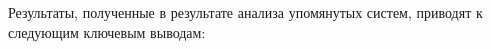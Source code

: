 Результаты, полученные в результате анализа упомянутых систем, приводят к следующим ключевым выводам:
%
%
%     
%
%
